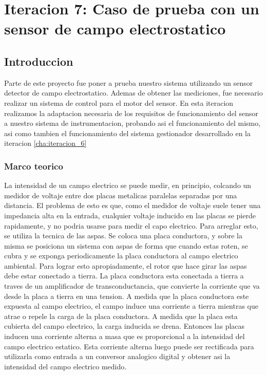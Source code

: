 \chapter{Iteracion 7: Caso de prueba con un sensor de campo electrostatico} %
\label{cha:iteracion_7}

\section{Introduccion} %
\label{sec:introduccion}

Parte de este proyecto fue poner a prueba nuestro sistema utilizando un sensor detector de campo electrostatico. Ademas de obtener las mediciones, fue necesario realizar un sistema de control para el motor del sensor. En esta iteracion realizamos la adaptacion necesaria de los requisitos de funcionamiento del sensor a nuestro sistema de instrumentacion, probando asi el funcionamiento del mismo, asi como tambien el funcionamiento del sistema gestionador desarrollado en la iteracion \ref{cha:iteracion_6} 

\subsection{Marco teorico} %
\label{sub:marco_teorico}

La intensidad de un campo electrico se puede medir, en principio, colcando un medidor de voltaje entre dos placas metalicas paralelas separadas por una distancia. El problema de esto es que, como el medidor de voltaje suele tener una impedancia alta en la entrada, cualquier voltaje inducido en las placas se pierde rapidamente, y no podria usarse para medir el capo electrico. Para arreglar esto, se utiliza la tecnica de las aspas. Se coloca una placa conductora, y sobre la misma se posiciona un sistema con aspas de forma que cuando estas roten, se cubra y se exponga periodicamente la placa conductora al campo electrico ambiental. Para lograr esto apropiadamente, el rotor que hace girar las aspas debe estar conectado a tierra. La placa conductora esta conectada a tierra a traves de un amplificador de transconductancia, que convierte la corriente que va desde la placa a tierra en una tension. A medida que la placa conductora este expuesta al campo electrico, el campo induce una corriente a tierra mientras que atrae o repele la carga de la placa conductora. A medida que la placa esta cubierta del campo electrico, la carga inducida se drena. Entonces las placas inducen una corriente alterna a masa que es proporcional a la intensidad del campo electrico estatico. Esta corriente alterna luego puede ser rectificada para utilizarla como entrada a un conversor analogico digital y obtener asi la intensidad del campo electrico medido. \\


